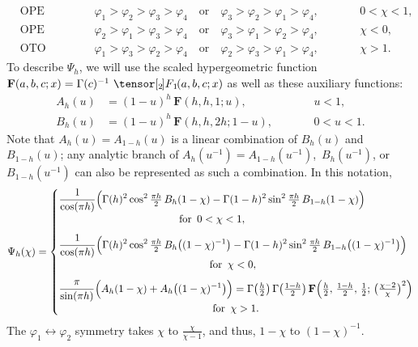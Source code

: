 \documentclass[12pt]{article}
\newcommand{\hgf}{%
\,\tensor[_{2\kern-1.2pt}]{F}{_{\kern-0.8pt 1}}\kern-1.2pt}
\newcommand{\hgfs}{\mathbf{F}}
\newcommand{\vp}{\varphi}
\begin{document}
\begin{equation} \label{regions}
\begin{alignedat}{3}
&\text{OPE region I:} \qquad&
&\vp_1>\vp_2>\vp_3>\vp_4 \quad\text{or}\quad \vp_3>\vp_2>\vp_1>\vp_4, \qquad&
&0<\chi<1,\\[3pt]
&\text{OPE region II:} \qquad&
&\vp_2>\vp_1>\vp_3>\vp_4 \quad\text{or}\quad \vp_3>\vp_1>\vp_2>\vp_4, \qquad&
& \chi<0,\\[3pt]
&\text{OTO region:} \qquad&
&\vp_1>\vp_3>\vp_2>\vp_4 \quad\text{or}\quad \vp_2>\vp_3>\vp_1>\vp_4, \qquad&
&\chi>1.
\end{alignedat}
\end{equation}
To describe $\Psi_{h}$, we will use the scaled hypergeometric function $\hgfs(a,b,c;x)=\Gamma(c)^{-1}\,\hgf(a,b,c;x)$ as well as these auxiliary functions:
\begin{equation}
\begin{alignedat}{2}
A_h(u)&=(1-u)^{h}\,\hgfs(h,h,1;u), \qquad&& u<1,\\[3pt] B_h(u)&=(1-u)^h\,\hgfs(h,h,2h;1-u), \qquad&& 0<u<1.
\end{alignedat}
\end{equation}
Note that $A_h(u)=A_{1-h}(u)$ is a linear combination of $B_{h}(u)$ and $B_{1-h}(u)$; any analytic branch of $A_h(u^{-1})=A_{1-h}(u^{-1})$,\, $B_{h}(u^{-1})$, or $B_{1-h}(u^{-1})$ can also be represented as such a combination. In this notation,
\begin{equation}\label{Psi_h}
\Psi_{h}(\chi)=\left\{\begin{array}{@{}l@{}}
\begin{gathered}
\frac{1}{\cos(\pi h)}\Bigl(
\Gamma(h)^2\cos^2\tfrac{\pi h}{2}\,B_{h}(1-\chi)
-\Gamma(1-h)^2\sin^2\tfrac{\pi h}{2}\,B_{1-h}(1-\chi)\Bigr)\\[-2pt]
\text{for }\, 0<\chi<1,
\end{gathered}\vspace{8pt}\\
\begin{gathered}
\frac{1}{\cos(\pi h)}\Bigl(
\Gamma(h)^2\cos^2\tfrac{\pi h}{2}\,
B_{h}\bigl((1-\chi)^{-1}\bigr)
-\Gamma(1-h)^2\sin^2\tfrac{\pi h}{2}\,
B_{1-h}\bigl((1-\chi)^{-1}\bigr)\Bigr)\\[-2pt]
\text{for }\, \chi<0,
\end{gathered}\vspace{8pt}\\
\begin{gathered}
\frac{\pi}{\sin(\pi h)}
\Bigl(A_h(1-\chi)+A_h\bigl((1-\chi)^{-1}\bigr)\Bigr)
=\Gamma\bigl(\tfrac{h}{2}\bigr)\,\Gamma\bigl(\tfrac{1-h}{2}\bigr)\,
\hgfs\Bigl(\tfrac{h}{2},\,\tfrac{1-h}{2},\,\tfrac{1}{2};\,
\bigl(\tfrac{\chi-2}{\chi}\bigr)^2\Bigr)\\[-2pt]
\text{for }\, \chi>1.
\end{gathered}
\end{array}\right.
\end{equation}
The $\vp_1\leftrightarrow\vp_2$ symmetry takes $\chi$ to $\frac{\chi}{\chi-1}$, and thus, $1-\chi$ to $(1-\chi)^{-1}$.
\end{document}
